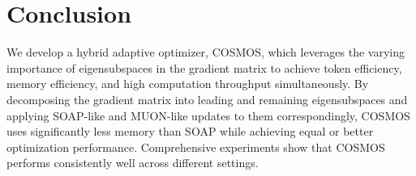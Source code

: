 \section{Conclusion}
We develop a hybrid adaptive optimizer, COSMOS, which leverages the varying importance of eigensubspaces in the gradient matrix to achieve token efficiency, memory efficiency, and high computation throughput simultaneously. 
By decomposing the gradient matrix into leading and remaining eigensubspaces and applying SOAP-like and MUON-like updates to them correspondingly, COSMOS uses significantly less memory than SOAP while achieving equal or better optimization performance. 
Comprehensive experiments show that COSMOS performs consistently well across different settings. 
